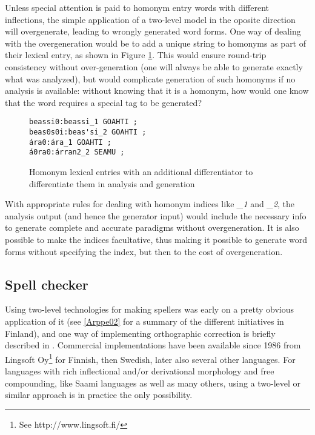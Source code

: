 \documentclass[a4paper,english]{article}
\begin{document}
Unless special attention is paid to homonym entry words with different inflections, the simple application of a two-level model in the oposite direction will overgenerate, leading to wrongly generated word forms. One way of dealing with the overgeneration would be to add a unique string to homonyms as part of their lexical entry, as shown in Figure \ref{homonlex}. This would ensure round-trip consistency without over-generation (one will always be able to generate exactly what was analyzed), but would complicate generation of such homonyms if no analysis is available: without knowing that it is a homonym, how would one know that the word requires a special tag to be generated?

\begin{figure}[htb]
\begin{center}
\begin{verbatim}
beassi0:beassi_1 GOAHTI ;
beas0s0i:beas'si_2 GOAHTI ;
ára0:ára_1 GOAHTI ;
á0ra0:árran2_2 SEAMU ;
\end{verbatim}
\end{center}
\caption{Homonym lexical entries with an additional differentiator to differentiate them in analysis and generation}
\label{homonlex}
\end{figure}

With appropriate rules for dealing with homonym indices like \textit{\_1} and \textit{\_2}, the analysis output (and hence the generator input) would include the necessary info to generate complete and accurate paradigms without overgeneration. It is also possible to make the indices facultative, thus making it possible to generate word forms without specifying the index, but then to the cost of overgeneration.

\subsection{Spell checker}\label{spell}

Using two-level technologies for making spellers was early on a pretty obvious application of it (see \ref{Arppe02} for a summary of the different initiatives in Finland), and one way of implementing orthographic correction is briefly described in \cite{Beesley03}. Commercial implementations have been available since 1986 from Lingsoft Oy\footnote{See http://www.lingsoft.fi/} for Finnish, then Swedish, later also several other languages. For languages with rich inflectional and/or derivational morphology and free compounding, like Saami languages as well as many others, using a two-level or similar approach is in practice the only possibility.
\end{document}
